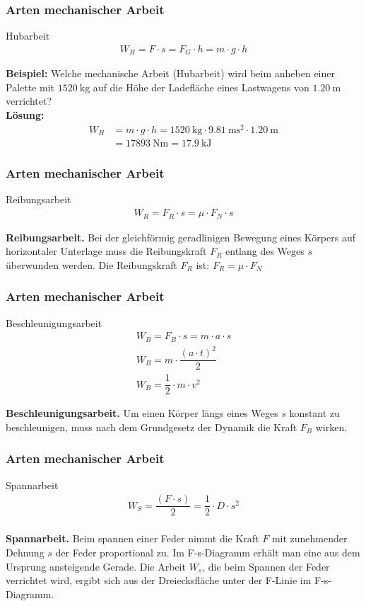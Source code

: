 \documentclass{beamer}
\begin{document}
\frame
{
  \frametitle{Arten mechanischer Arbeit}
  \begin{block}{Hubarbeit}
	\begin{align}
	W_H=F\cdot s=F_G\cdot h=m\cdot g\cdot h
	\end{align}
  \end{block}
  \textbf{Beispiel:} Welche mechanische Arbeit (Hubarbeit) wird beim anheben einer Palette mit $\SI{1520}{\kilo\gram}$ auf die Höhe der Ladefläche eines Lastwagens von $\SI{1,20}{\meter}$ verrichtet?\\
  \textbf{Lösung:}
  \begin{align*}
  W_H&=m\cdot g\cdot h=\SI{1520}{\kilo\gram}\cdot \SI{9,81}{\meter\square\second}\cdot \SI{1,20}{\meter}\\
  &=\SI{17893}{\newton\meter}=\SI{17,9}{\kilo\joule}
  \end{align*}
}

\frame
{
  \frametitle{Arten mechanischer Arbeit}
  \begin{block}{Reibungsarbeit}
	\begin{align}
	W_R=F_R\cdot s=\mu\cdot F_N\cdot s
	\end{align}
  \end{block}
  \textbf{Reibungsarbeit.} Bei der gleichförmig geradlinigen Bewegung eines Körpers auf horizontaler Unterlage muss die Reibungskraft $F_R$ entlang des Weges $s$ überwunden werden. Die Reibungskraft $F_R$ ist: $F_R=\mu\cdot F_N$
}

\frame
{
  \frametitle{Arten mechanischer Arbeit}
  \begin{block}{Beschleunigungsarbeit}
	\begin{align}
	W_B=F_B\cdot s=m\cdot a\cdot s\\
	W_B=m\cdot\dfrac{(a\cdot t)^{2}}{2}\\
	W_B=\dfrac{1}{2}\cdot m\cdot v^{2}
	\end{align}
  \end{block}
  \textbf{Beschleunigungsarbeit.} Um einen Körper längs eines Weges $s$ konstant zu beschleunigen, muss nach dem Grundgesetz der Dynamik die Kraft $F_B$ wirken.
}

\frame
{
  \frametitle{Arten mechanischer Arbeit}
  \begin{block}{Spannarbeit}
	\begin{align}
	W_S=\dfrac{(F\cdot s)}{2}=\dfrac{1}{2}\cdot D\cdot s^{2}\\
	\end{align}
  \end{block}
  \textbf{Spannarbeit.} Beim spannen einer Feder nimmt die Kraft $F$ mit zunehmender Dehnung $s$ der Feder proportional zu. Im F-s-Diagramm erhält man eine aus dem Ursprung ansteigende Gerade. Die Arbeit $W_s$, die beim Spannen der Feder verrichtet wird, ergibt sich aus der Dreiecksfläche unter der F-Linie im F-s-Diagramm.
}
\end{document}
